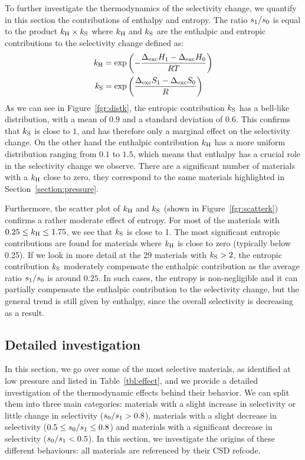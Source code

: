 \documentclass[main]{subfiles}
\begin{document}
  To further investigate the thermodynamics of the selectivity change, we quantify in this section the contributions of enthalpy and entropy. The ratio ${s_{\text{1}}}/{s_{\text{0}}}$ is equal to the product $k_{\text{H}} \times k_{\text{S}}$ where $k_{\text{H}}$ and $k_{\text{S}}$ are the enthalpic and entropic contributions to the selectivity change defined as:
  \begin{equation}
  \label{eqn:effects}
      \begin{split}
       k_{\text{H}} & = \exp\left(-\dfrac{\Delta_{\text{exc}}H_{\text{1}}-\Delta_{\text{exc}}H_{\text{0}}}{RT}\right) \\ k_{\text{S}} & = \exp\left(\dfrac{\Delta_{\text{exc}}S_{\text{1}}-\Delta_{\text{exc}}S_{\text{0}}}{R}\right)
      \end{split}
  \end{equation}
  As we can see in Figure~\ref{fgr:distk}, the entropic contribution $k_{\text{S}}$ has a bell-like distribution, with a mean of $0.9$ and a standard deviation of $0.6$. This confirms that $k_{\text{S}}$ is close to $1$, and has therefore only a marginal effect on the selectivity change. On the other hand the enthalpic contribution $k_{\text{H}}$ has a more uniform distribution ranging from $0.1$ to $1.5$, which means that enthalpy has a crucial role in the selectivity change we observe. There are a significant number of materials with a $k_{\text{H}}$ close to zero, they correspond to the same materials highlighted in Section~\ref{section:pressure}.
  
  Furthermore, the scatter plot of $k_{\text{H}}$ and $k_{\text{S}}$ (shown in Figure~\ref{fgr:scatterk}) confirms a rather moderate effect of entropy. For most of the materials with $0.25 \le k_{\text{H}} \le 1.75$, we see that $k_{\text{S}}$ is close to 1. The most significant entropic contributions are found for materials where $k_{\text{H}}$ is close to zero (typically below 0.25). If we look in more detail at the 29 materials with $k_{\text{S}}>2$, the entropic contribution $k_{\text{S}}$ moderately compensate the enthalpic contribution as the average ratio $s_{\text{1}}/s_{\text{0}}$ is around $0.25$. In such cases, the entropy is non-negligible and it can partially compensate the enthalpic contribution to the selectivity change, but the general trend is still given by enthalpy, since the overall selectivity is decreasing as a result.
  
  
  \subsection{Detailed investigation}
  \label{sec:archetypes}
  
  In this section, we go over some of the most selective materials, as identified at low pressure and listed in Table~\ref{tbl:effect}, and we provide a detailed investigation of the thermodynamic effects behind their behavior. We can split them into three main categories: materials with a slight increase in selectivity or little change in selectivity ($s_{\text{0}}/s_{\text{1}} > 0.8$), materials with a slight decrease in selectivity ($0.5 \le s_{\text{0}}/s_{\text{1}} \le 0.8$) and materials with a significant decrease in selectivity ($s_{\text{0}}/s_{\text{1}} < 0.5$). In this section, we investigate the origins of these different behaviours: all materials are referenced by their CSD refcode.
  
\end{document}
